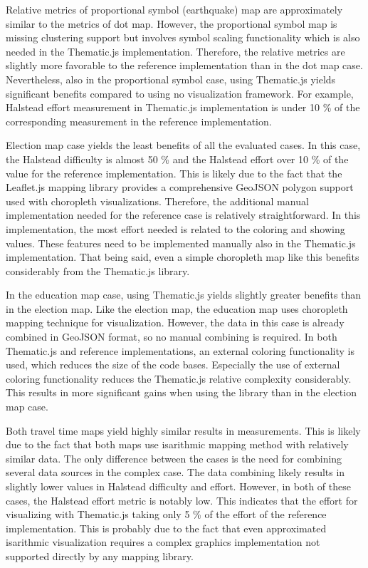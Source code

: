 Relative metrics of proportional symbol (earthquake) map are approximately similar to the metrics of dot map. However, the proportional symbol map is missing clustering support but involves symbol scaling functionality which is also needed in the Thematic.js implementation. Therefore, the relative metrics are slightly more favorable to the reference implementation than in the dot map case. Nevertheless, also in the proportional symbol case, using Thematic.js yields significant benefits compared to using no visualization framework. For example, Halstead effort measurement in Thematic.js implementation is under 10 \% of the corresponding measurement in the reference implementation.

Election map case yields the least benefits of all the evaluated cases. In this case, the Halstead difficulty is almost 50 \% and the Halstead effort over 10 \% of the value for the reference implementation. This is likely due to the fact that the Leaflet.js mapping library provides a comprehensive GeoJSON polygon support used with choropleth visualizations. Therefore, the additional manual implementation needed for the reference case is relatively straightforward. In this implementation, the most effort needed is related to the coloring and showing values. These features need to be implemented manually also in the Thematic.js implementation. That being said, even a simple choropleth map like this benefits considerably from the Thematic.js library.

In the education map case, using Thematic.js yields slightly greater benefits than in the election map. Like the election map, the education map uses choropleth mapping technique for visualization. However, the data in this case is already combined in GeoJSON format, so no manual combining is required. In both Thematic.js and reference implementations, an external coloring functionality is used, which reduces the size of the code bases. Especially the use of external coloring functionality reduces the Thematic.js relative complexity considerably. This results in more significant gains when using the library than in the election map case.

Both travel time maps yield highly similar results in measurements. This is likely due to the fact that both maps use isarithmic mapping method with relatively similar data. The only difference between the cases is the need for combining several data sources in the complex case. The data combining likely results in slightly lower values in Halstead difficulty and effort. However, in both of these cases, the Halstead effort metric is notably low. This indicates that the effort for visualizing with Thematic.js taking only 5 \% of the effort of the reference implementation. This is probably due to the fact that even approximated isarithmic visualization requires a complex graphics implementation not supported directly by any mapping library.

